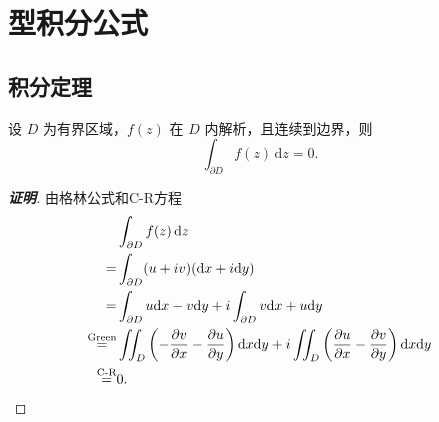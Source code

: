 \documentclass[openany,oneside]{ctexbook}
\begin{document}
\section{型积分公式}
\subsection{积分定理}
\begin{theorem}
设 $D$ 为有界区域，$f(z)$ 在 $D$ 内解析，且连续到边界，则
\[
\int_{\partial D} f(z)\,\mathrm{d}z = 0.
\]
\end{theorem}

\begin{proof}[\textbf{证明}]
    由格林公式和C-R方程
    \begin{align*}
        & \int_{\partial D} f(z)\,\mathrm{d}z \\
        = &\int_{\partial D} (u + iv)(\mathrm{d}x + i\mathrm{d}y) \\
        = &\int_{\partial D} u\mathrm{d}x - v\mathrm{d}y + i\int_{\partial D} v\mathrm{d}x + u\mathrm{d}y\\
        \overset{\text{Green}}{=} &\iint_D \left(-\frac{\partial v}{\partial x} - \frac{\partial u}{\partial y}\right) \mathrm{d}x\mathrm{d}y + i\iint_D \left(\frac{\partial u}{\partial x} - \frac{\partial v}{\partial y}\right) \mathrm{d}x\mathrm{d}y \\
       \overset{\text{C-R}}{=} & 0.\qedhere
    \end{align*}
\end{proof}
\end{document}
